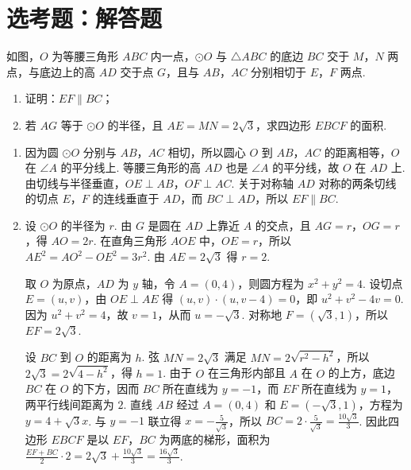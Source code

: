 \section{选考题：解答题}

\begin{problem}
如图，\(O\) 为等腰三角形 \(ABC\) 内一点，\(\odot O\) 与 \(\triangle ABC\) 的底边 \(BC\) 交于 \(M\)，\(N\) 两点，与底边上的高 \(AD\) 交于点 \(G\)，且与 \(AB\)，\(AC\) 分别相切于 \(E\)，\(F\) 两点.

\begin{enumerate}
\item 证明：\(EF\parallel BC\)；
\item 若 \(AG\) 等于 \(\odot O\) 的半径，且 \(AE=MN=2\sqrt{3}\)，求四边形 \(EBCF\) 的面积.
\end{enumerate}

\end{problem}

\begin{solution}
\begin{enumerate}
\item 因为圆 \(\odot O\) 分别与 \(AB\)，\(AC\) 相切，所以圆心 \(O\) 到 \(AB\)，\(AC\) 的距离相等，\(O\) 在 \(\angle A\) 的平分线上. 等腰三角形的高 \(AD\) 也是 \(\angle A\) 的平分线，故 \(O\) 在 \(AD\) 上. 由切线与半径垂直，\(OE\perp AB\)，\(OF\perp AC\). 关于对称轴 \(AD\) 对称的两条切线的切点 \(E\)，\(F\) 的连线垂直于 \(AD\)，而 \(BC\perp AD\)，所以 \(EF\parallel BC\).
\item 设 \(\odot O\) 的半径为 \(r\). 由 \(G\) 是圆在 \(AD\) 上靠近 \(A\) 的交点，且 \(AG=r\)，\(OG=r\)，得 \(AO=2r\). 在直角三角形 \(AOE\) 中，\(OE=r\)，所以 \(AE^2=AO^2-OE^2=3r^2\). 由 \(AE=2\sqrt3\) 得 \(r=2\).

取 \(O\) 为原点，\(AD\) 为 \(y\) 轴，令 \(A=(0,4)\)，则圆方程为 \(x^2+y^2=4\). 设切点 \(E=(u,v)\)，由 \(OE\perp AE\) 得 \((u,v)\cdot(u,v-4)=0\)，即 \(u^2+v^2-4v=0\). 因为 \(u^2+v^2=4\)，故 \(v=1\)，从而 \(u=-\sqrt3\). 对称地 \(F=(\sqrt3,1)\)，所以 \(EF=2\sqrt3\).

设 \(BC\) 到 \(O\) 的距离为 \(h\). 弦 \(MN=2\sqrt3\) 满足 \(MN=2\sqrt{r^2-h^2}\)，所以 \(2\sqrt3=2\sqrt{4-h^2}\)，得 \(h=1\). 由于 \(O\) 在三角形内部且 \(A\) 在 \(O\) 的上方，底边 \(BC\) 在 \(O\) 的下方，因而 \(BC\) 所在直线为 \(y=-1\)，而 \(EF\) 所在直线为 \(y=1\)，两平行线间距离为 \(2\). 直线 \(AB\) 经过 \(A=(0,4)\) 和 \(E=(-\sqrt3,1)\)，方程为 \(y=4+\sqrt3x\). 与 \(y=-1\) 联立得 \(x=-\frac5{\sqrt3}\)，所以 \(BC=2\cdot\frac5{\sqrt3}=\frac{10\sqrt3}{3}\). 因此四边形 \(EBCF\) 是以 \(EF\)，\(BC\) 为两底的梯形，面积为 \(\frac{EF+BC}{2}\cdot2=2\sqrt3+\frac{10\sqrt3}{3}=\frac{16\sqrt3}{3}\).
\end{enumerate}
\end{solution}

